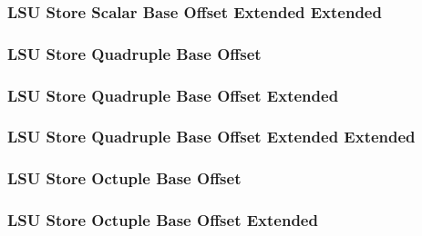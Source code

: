 \subsubsection[{\small LSU Store Scalar Base Offset Extended Extended}]{LSU Store Scalar Base Offset Extended Extended} \label{sec:format-LSU-SSBO.Y}



\subsubsection[{\small LSU Store Quadruple Base Offset}]{LSU Store Quadruple Base Offset} \label{sec:format-LSU-SQBO}



\subsubsection[{\small LSU Store Quadruple Base Offset Extended}]{LSU Store Quadruple Base Offset Extended} \label{sec:format-LSU-SQBO.X}



\subsubsection[{\small LSU Store Quadruple Base Offset Extended Extended}]{LSU Store Quadruple Base Offset Extended Extended} \label{sec:format-LSU-SQBO.Y}



\subsubsection[{\small LSU Store Octuple Base Offset}]{LSU Store Octuple Base Offset} \label{sec:format-LSU-SOBO}



\subsubsection[{\small LSU Store Octuple Base Offset Extended}]{LSU Store Octuple Base Offset Extended} \label{sec:format-LSU-SOBO.X}

